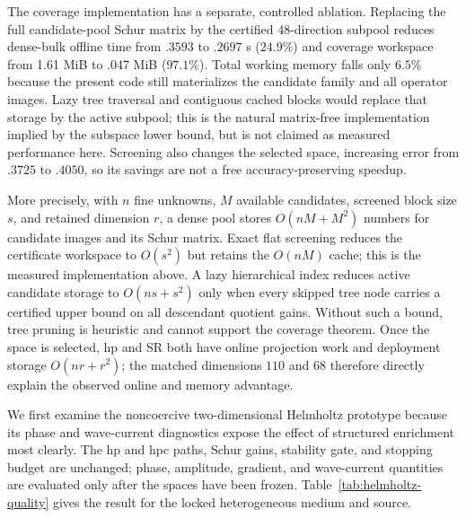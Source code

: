 \documentclass[11pt]{article}
\numberwithin{algorithm}{section}
\theoremstyle{definition}\newtheorem{definition}[theorem]{Definition}
\theoremstyle{remark}\newtheorem{remark}[theorem]{Remark}
\begin{document}
The coverage implementation has a separate, controlled ablation.  Replacing
the full candidate-pool Schur matrix by the certified $48$-direction subpool
reduces dense-bulk offline time from $.3593$ to $.2697$ s ($24.9\%$) and
coverage workspace from 1.61 MiB to .047 MiB ($97.1\%$).  Total working memory
falls only $6.5\%$ because the present code still materializes the candidate family
and all operator images.  Lazy tree traversal and contiguous cached blocks
would replace that storage by the active subpool; this is the natural
matrix-free implementation implied by the subspace lower bound, but is not
claimed as measured performance here.  Screening also changes the selected
space, increasing error from $.3725$ to $.4050$, so its savings are not a
free accuracy-preserving speedup.

More precisely, with $n$ fine unknowns, $M$ available candidates, screened
block size $s$, and retained dimension $r$, a dense pool stores
$O(nM+M^2)$ numbers for candidate images and its Schur matrix.  Exact flat
screening reduces the certificate workspace to $O(s^2)$ but retains the
$O(nM)$ cache; this is the measured implementation above.  A lazy hierarchical
index reduces active candidate storage to $O(ns+s^2)$ only when every skipped
tree node carries a certified upper bound on all descendant quotient gains.
Without such a bound, tree pruning is heuristic and cannot support the
coverage theorem.  Once the space is selected, hp and SR both have online
projection work and deployment storage $O(nr+r^2)$; the matched dimensions
$110$ and $68$ therefore directly explain the observed online and memory
advantage.

We first examine the noncoercive two-dimensional Helmholtz prototype because
its phase and wave-current diagnostics expose the effect of structured
enrichment most clearly.  The hp and hpc paths, Schur gains, stability gate,
and stopping budget are unchanged; phase, amplitude, gradient, and
wave-current quantities are evaluated only after the spaces have been frozen.
Table~\ref{tab:helmholtz-quality} gives the result for the locked heterogeneous
medium and source.
\end{document}
